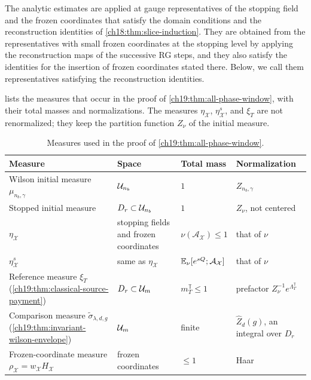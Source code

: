 The analytic estimates are applied at gauge representatives of the stopping field and the frozen coordinates that satisfy the domain conditions and the reconstruction identities of \cref{ch18:thm:slice-induction}. They are obtained from the representatives with small frozen coordinates at the stopping level by applying the reconstruction maps of the successive RG steps, and they also satisfy the identities for the insertion of frozen coordinates stated there. Below, we call them representatives satisfying the reconstruction identities.

 lists the measures that occur in the proof of \cref{ch19:thm:all-phase-window}, with their total masses and normalizations. The measures $\eta_{\mathcal X}$, $\eta_{\mathcal X}^s$, and $\xi_T$ are not renormalized; they keep the partition function $Z_\nu$ of the initial measure.

\begin{table}[htbp]
\centering\small
\caption{Measures used in the proof of \cref{ch19:thm:all-phase-window}.}
\label{ch19:tab:measures}
\begin{tabular}{@{}>{\raggedright\arraybackslash}p{}
>{\raggedright\arraybackslash}p{}
>{\raggedright\arraybackslash}p{}
>{\raggedright\arraybackslash}p{}@{}}
\toprule
Measure & Space & Total mass & Normalization \\
\midrule
Wilson initial measure $\mu_{n_b,\gamma}$ & $\mathcal U_{n_b}$ & $1$ & $Z_{n_b,\gamma}$ \\
Stopped initial measure & $D_r\subset\mathcal U_{n_b}$ & $1$ & $Z_\nu$, not centered \\
$\eta_{\mathcal X}$ & stopping fields and frozen coordinates & $\nu(\mathcal A_{\mathcal X})\le1$ & that of $\nu$ \\
$\eta_{\mathcal X}^s$ & same as $\eta_{\mathcal X}$ & $\mathbb E_\nu[e^{sQ};\mathcal A_{\mathcal X}]$ & that of $\nu$ \\
Reference measure $\xi_T$ (\cref{ch19:thm:classical-source-payment}) & $D_r\subset\mathcal U_{m}$ & $m_T^{\mathbb T}\le1$ & prefactor $Z_\nu^{-1}e^{\Lambda_T^{\mathbb T}}$ \\
Comparison measure $\widetilde\sigma_{\lambda,d,g}$ (\cref{ch19:thm:invariant-wilson-envelope}) & $\mathcal U_{m}$ & finite & $\widehat Z_d(g)$, an integral over $D_r$ \\
Frozen-coordinate measure $\rho_{\mathcal X}=w_{\mathcal X}H_{\mathcal X}$ & frozen coordinates & $\le1$ & Haar \\
\bottomrule
\end{tabular}
\end{table}

